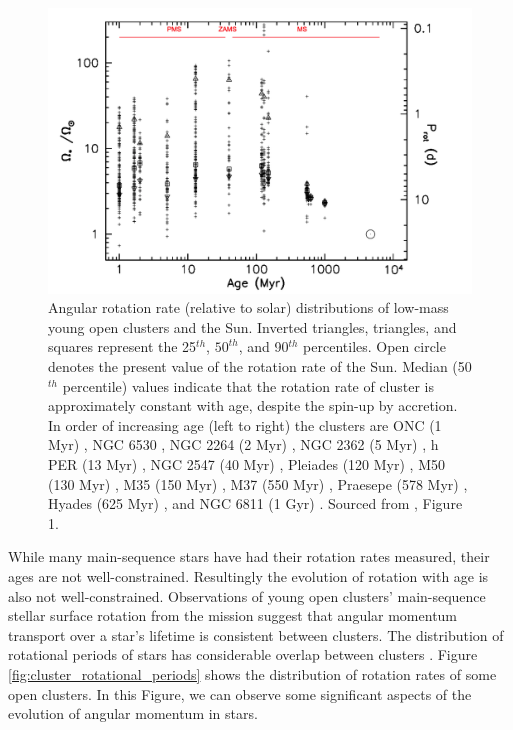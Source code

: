 \begin{figure}
    \includegraphics[width=\textwidth]{Figures/intro_figures/pms_evo.png}
    \caption[Angular rotation rate distributions of low-mass young open clusters and the Sun over time.]{Angular rotation rate (relative to solar) distributions of low-mass young open clusters and the Sun. Inverted triangles, triangles, and squares represent the 25$^{th}$, $50^{th}$, and 90$^{th}$ percentiles. Open circle denotes the present value of the rotation rate of the Sun. Median (50$^{th}$ percentile) values indicate that the rotation rate of cluster is approximately constant with age, despite the spin-up by accretion. In order of increasing age (left to right) the clusters are ONC (1 Myr) \citep{herbst_stellar_2002}, NGC 6530 \citep{henderson_time-series_2012}, NGC 2264 (2 Myr) \citep{affer_rotation_2013}, NGC 2362 (5 Myr) \citep{irwin_monitor_2008}, h PER (13 Myr) \citep{moraux_monitor_2013}, NGC 2547 (40 Myr) \citep{irwin_monitor_2008}, Pleiades (120 Myr) \citep{hartman_large_2010}, M50 (130 Myr) \citep{irwin_monitor_2009}, M35 (150 Myr) \citep{meibom_slar_2009}, M37 (550 Myr) \citep{hartman_deep_2009}, Praesepe (578 Myr) \citep{delorme_stellar_2011}, Hyades (625 Myr) \citep{delorme_stellar_2011}, and NGC 6811 (1 Gyr) \citep{meibom_kepler_2011}.  Sourced from \citet{gallet_improved_2013},  Figure 1.}
    \label{fig:pms_ms_evo}
\end{figure}

While many main-sequence stars have had their rotation rates measured, their ages are not well-constrained.
Resultingly the evolution of rotation with age is also not well-constrained.
Observations of young open clusters' main-sequence stellar surface rotation from the \kepler{} mission suggest that angular momentum transport over a star's lifetime is consistent between clusters.
The distribution of rotational periods of stars has considerable overlap between clusters \citep{spina_how_2020, curtis_when_2020}. 
Figure \ref{fig:cluster_rotational_periods} shows the distribution of rotation rates of some open clusters.
In this Figure, we can observe some significant aspects of the evolution of angular momentum in stars.


